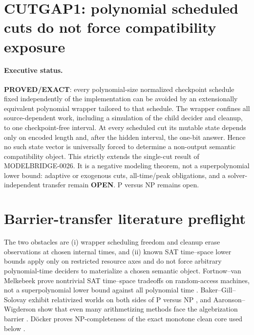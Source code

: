 \documentclass[11pt]{article}
\newcommand{\OPEN}{\textbf{OPEN}}
\newcommand{\EXACT}{\textbf{PROVED/EXACT}}
\begin{document}
\section*{CUTGAP1: polynomial scheduled cuts do not force compatibility exposure}

\paragraph{Executive status.}
\EXACT: every polynomial-size normalized checkpoint schedule fixed independently of the
implementation can be avoided by an extensionally equivalent polynomial wrapper tailored
to that schedule.  The wrapper confines all
source-dependent work, including a simulation of the child decider and cleanup, to one
checkpoint-free interval.  At every scheduled cut its mutable state depends only on
encoded length and, after the hidden interval, the one-bit answer.  Hence no such state
vector is universally forced to determine a non-output semantic compatibility object.
This strictly extends the single-cut result of MODELBRIDGE-0026.  It is a negative
modeling theorem, not a superpolynomial lower bound: adaptive or exogenous cuts,
all-time/peak obligations, and a solver-independent transfer remain \OPEN.  P versus NP
remains open.

\section{Barrier-transfer literature preflight}

The two obstacles are (i) wrapper scheduling freedom and cleanup erase observations at
chosen internal times, and (ii) known SAT time--space lower bounds apply only on restricted
resource axes and do not force arbitrary polynomial-time deciders to materialize a chosen
semantic object.  Fortnow--van Melkebeek prove nontrivial SAT time--space tradeoffs on
random-access machines, not a superpolynomial lower bound against all polynomial time
\cite{fvm}.  Baker--Gill--Solovay exhibit relativized worlds on both sides of P versus NP
\cite{bgs}, and Aaronson--Wigderson show that even many arithmetizing methods face the
algebrization barrier \cite{aw}.  D\"ocker proves NP-completeness of the exact monotone
clean core used below \cite{docker}.
\end{document}
